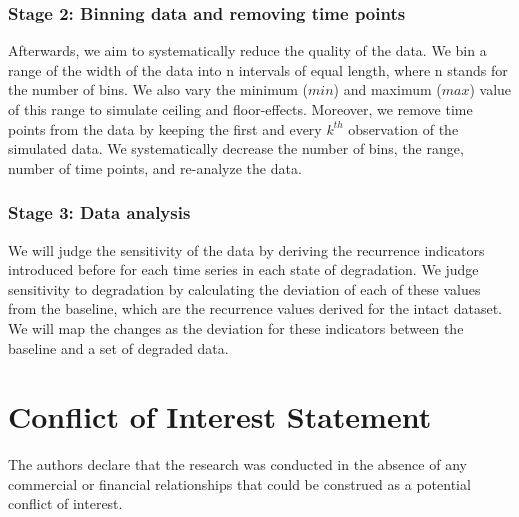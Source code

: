 \documentclass[utf8]{FrontiersinVancouver}
\begin{document}
\subsubsection{Stage 2: Binning data and removing time points}

Afterwards, we aim to systematically reduce the quality of the data. We bin a range of the width of the data into n intervals of equal length, where n stands for the number of bins.  We also vary the minimum ($min$) and maximum ($max$) value of this range to simulate ceiling and floor-effects. Moreover, we remove time points from the data by keeping the first and every $k^{th}$ observation of the simulated data. We systematically decrease the number of bins, the range, number of time points, and re-analyze the data.

\subsubsection{Stage 3: Data analysis}

We will judge the sensitivity of the data by deriving the recurrence indicators introduced before for each time series in each state of degradation. We judge sensitivity to degradation by calculating the deviation of each of these values from the baseline, which are the recurrence values derived for the intact dataset. We will map the changes as the deviation for these indicators between the baseline and a set of degraded data.





\section*{Conflict of Interest Statement}
The authors declare that the research was conducted in the absence of any commercial or financial relationships that could be construed as a potential conflict of interest.
\end{document}
